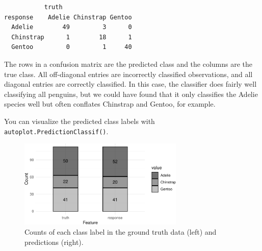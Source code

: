 \begin{Shaded}
\begin{Highlighting}[]
\SpecialCharTok{$}
\end{Highlighting}
\end{Shaded}

\begin{verbatim}
           truth
response    Adelie Chinstrap Gentoo
  Adelie        49         3      0
  Chinstrap      1        18      1
  Gentoo         0         1     40
\end{verbatim}

The rows in a confusion matrix are the predicted class and the columns
are the true class. All off-diagonal entries are incorrectly classified
observations, and all diagonal entries are correctly classified. In this
case, the classifier does fairly well classifying all penguins, but we
could have found that it only classifies the Adelie species well but
often conflates Chinstrap and Gentoo, for example.

You can visualize the predicted class labels with
\texttt{autoplot.PredictionClassif()}.

\begin{Shaded}
\begin{Highlighting}[]
\end{Highlighting}
\end{Shaded}

\begin{figure}

{\centering \includegraphics[width=0.7\textwidth,height=\textheight]{chapters/chapter2/data_and_basic_modeling_files/figure-pdf/fig-basics-classlabels-1.pdf}

}

\caption{\label{fig-basics-classlabels}Counts of each class label in the
ground truth data (left) and predictions (right).}

\end{figure}

